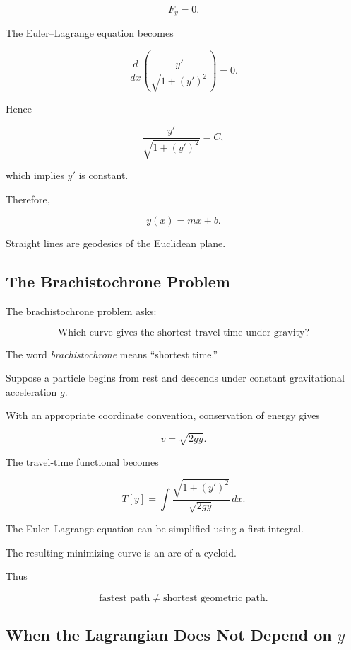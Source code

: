 \[
F_y=0.
\]

The Euler--Lagrange equation becomes

\[
\frac{d}{dx}
\left(
\frac{y'}{\sqrt{1+(y')^2}}
\right)
=
0.
\]

Hence

\[
\frac{y'}{\sqrt{1+(y')^2}}
=
C,
\]

which implies \(y'\) is constant.

Therefore,

\[
\boxed{
y(x)=mx+b.
}
\]

Straight lines are geodesics of the Euclidean plane.

\subsection{The Brachistochrone Problem}
\label{subsec:brachistochrone}

The brachistochrone problem asks:

\[
\boxed{
\text{Which curve gives the shortest travel time under gravity?}
}
\]

The word \emph{brachistochrone} means ``shortest time.''

Suppose a particle begins from rest and descends under constant
gravitational acceleration \(g\).

With an appropriate coordinate convention, conservation of energy gives

\[
v=\sqrt{2gy}.
\]

The travel-time functional becomes

\[
\boxed{
T[y]
=
\int
\frac{\sqrt{1+(y')^2}}
{\sqrt{2gy}}
\,dx.
}
\]

The Euler--Lagrange equation can be simplified using a first integral.

The resulting minimizing curve is an arc of a cycloid.

Thus

\[
\boxed{
\text{fastest path}
\neq
\text{shortest geometric path}.
}
\]

\subsection{When the Lagrangian Does Not Depend on \(y\)}
\label{subsec:lagrangian-independent-y}

